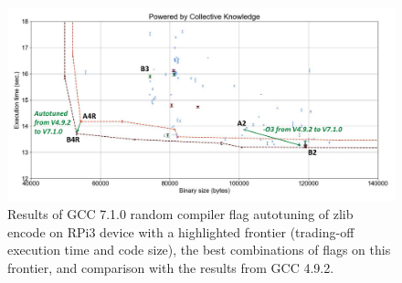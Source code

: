    \begin{figure}[!htbp]
     \centering
      \includegraphics[width=5.2in]
      {ck-assets/2318dcb514171ad4-cropped.pdf} %
      \vspace{0.1in}
      \vspace{0.1in}
     \caption{
       Results of GCC 7.1.0 random compiler flag autotuning of zlib encode on RPi3 device 
       with a highlighted frontier (trading-off execution time and code size), 
       the best combinations of flags on this frontier, and comparison with the results from GCC 4.9.2.
     }
     \label{fig:autotuning-zlib-encode-gcc7}
   \end{figure}

